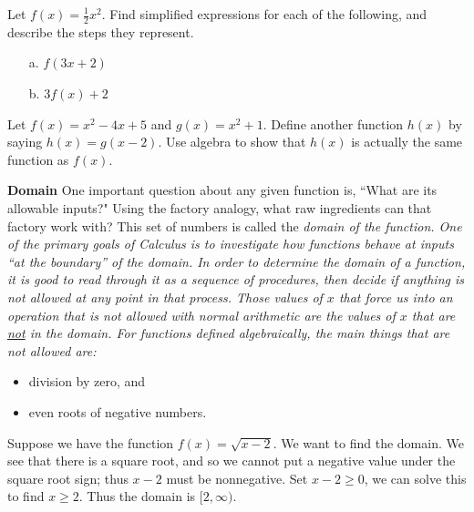 \begin{question} Let $f(x) = \frac12 x^2$.  Find simplified expressions for each of the following, and describe the steps they represent.

\begin{enumerate}
    \item[a.] $f(3x+2)$
    \item[b.] $3f(x) + 2$
\end{enumerate}
\end{question}



\begin{question} Let $f(x) = x^2-4x+5$ and $g(x) = x^2+1$. Define another function $h(x)$ by saying $h(x) = g(x-2)$. Use algebra to show that $h(x)$ is actually the same function as $f(x)$.
\end{question}

\par

{\bf Domain} One important question about any given function is, ``What are its allowable inputs?" Using the factory analogy, what raw ingredients can that factory work with? This set of numbers is called the \it{domain }\normalfont of the function. One of the primary goals of Calculus is to investigate how functions behave at inputs ``at the boundary'' of the domain. In order to determine the domain of a function, it is good to read through it as a sequence of procedures, then decide if anything is not allowed at any point in that process. Those values of $x$ that force us into an operation that is not allowed with normal arithmetic are the values of $x$ that are \underline{not} \normalfont in the domain.  For functions defined algebraically, the main things that are not allowed are:
\begin{itemize}
\item division by zero, and
\item even roots of negative numbers.
\end{itemize}


\begin{eg}
Suppose we have the function $f(x) = \sqrt{x-2}$.  We want to find the domain.  We see that there is a square root, and so we cannot put a negative value under the square root sign;  thus $x-2$ must be nonnegative.  Set $x-2 \geq 0$, we can solve this to find $x \geq 2$.  Thus the domain is $[2, \infty)$.  
\end{eg}


